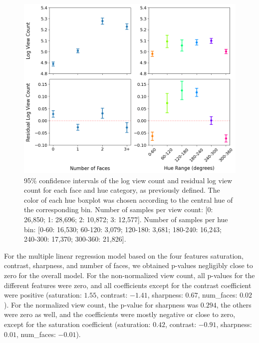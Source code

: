\documentclass{article}
\begin{document}
\begin{figure}[h]
  \begin{minipage}[t]{0.67\textwidth}
    \vspace{0pt}  %
    \includegraphics[width=\textwidth]{figs/faces-and-hue.png}
  \end{minipage}%
  \hspace{0.05\textwidth}%
  \begin{minipage}[t]{0.27\textwidth}
    \vspace{0pt}  %
    \caption{95\% confidence intervals of the log view count and residual log view count for each face and hue category, as previously defined. The color of each hue boxplot was chosen according to the central hue of the corresponding bin. Number of samples per view count: [0: 26,850; 1: 28,696; 2: 10,872; 3: 12,577]. Number of samples per hue bin: [0-60: 16,530; 60-120: 3,079; 120-180: 3,681; 180-240: 16,243; 240-300: 17,370; 300-360: 21,826].}
    \label{fig:faces-and-hue}
  \end{minipage}
\end{figure}

For the multiple linear regression model based on the four features saturation, contrast, sharpness, and number of faces, we obtained p-values negligibly close to zero for the overall model. For the non-normalized view count, all p-values for the different features were zero, and all coefficients except for the contrast coefficient were positive (saturation: $1.55$, contrast: $-1.41$, sharpness: $0.67$, num\_faces: $0.02$). For the normalized view count, the p-value for sharpness was $0.294$, the others were zero as well, and the coefficients were mostly negative or close to zero, except for the saturation coefficient (saturation: $0.42$, contrast: $-0.91$, sharpness: $0.01$, num\_faces: $-0.01$).
\end{document}
